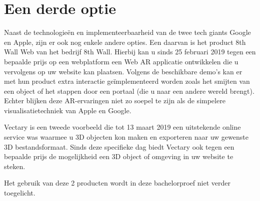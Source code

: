 \section{Een derde optie}
\label{sec:een-derde-optie}

Naast de technologieën en implementeerbaarheid van de twee tech giants Google en Apple, zijn er ook nog enkele andere opties. Een daarvan is het product 8th Wall Web van het bedrijf 8th Wall. Hierbij kan u sinds 25 februari 2019 tegen een bepaalde prijs op een webplatform een Web AR applicatie ontwikkelen die u vervolgens op uw website kan plaatsen. Volgens de beschikbare demo's kan er met hun product extra interactie geïmplementeerd worden zoals het smijten van een object of het stappen door een portaal (die u naar een andere wereld brengt). Echter blijken deze AR-ervaringen niet zo soepel te zijn als de simpelere visualisatietechniek van Apple en Google. 

Vectary is een tweede voorbeeld die tot 13 maart 2019 een uitstekende online service was waarmee u 3D objecten kon maken en exporteren naar uw gewenste 3D bestandsformaat. Sinds deze specifieke dag biedt Vectary ook tegen een bepaalde prijs de mogelijkheid een 3D object of omgeving in uw website te steken.~\autocite{Vectary2019}

Het gebruik van deze 2 producten wordt in deze bachelorproef niet verder toegelicht.




